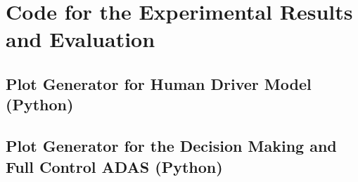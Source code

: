 \chapter{Code for the Experimental Results and Evaluation}

\section{Plot Generator for Human Driver Model (Python)}



\section{Plot Generator for the Decision Making and Full Control ADAS (Python)}

